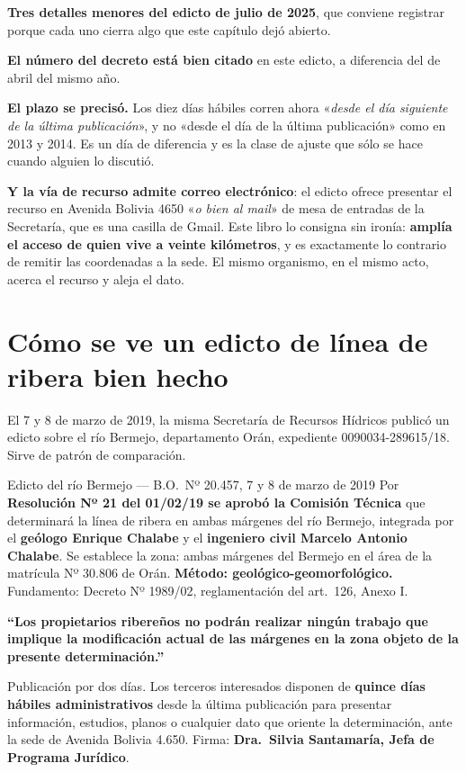 \textbf{Tres detalles menores del edicto de julio de 2025}, que conviene registrar porque cada uno cierra
algo que este capítulo dejó abierto.

\textbf{El número del decreto está bien citado} en este edicto, a diferencia del de abril del mismo año.

\textbf{El plazo se precisó.} Los diez días hábiles corren ahora «\textit{desde el día siguiente
de la última publicación}», y no «desde el día de la última publicación» como en 2013 y 2014. Es
un día de diferencia y es la clase de ajuste que sólo se hace cuando alguien lo discutió.

\textbf{Y la vía de recurso admite correo electrónico}: el edicto ofrece presentar el recurso en
Avenida Bolivia 4650 «\textit{o bien al mail}» de mesa de entradas de la Secretaría, que es una
casilla de Gmail. Este libro lo consigna sin ironía: \textbf{amplía el acceso de quien vive a
veinte kilómetros}, y es exactamente lo contrario de remitir las coordenadas a la sede. El mismo
organismo, en el mismo acto, acerca el recurso y aleja el dato.

\section{Cómo se ve un edicto de línea de ribera bien hecho}

El 7 y 8 de marzo de 2019, la misma Secretaría de Recursos Hídricos publicó un edicto sobre el río Bermejo, departamento Orán, expediente 0090034-289615/18. Sirve de patrón de comparación.

\begin{ficha}{Edicto del río Bermejo --- B.O.\ Nº 20.457, 7 y 8 de marzo de 2019}
Por \textbf{Resolución Nº 21 del 01/02/19 se aprobó la Comisión Técnica} que determinará la línea de ribera en ambas márgenes del río Bermejo, integrada por el \textbf{geólogo Enrique Chalabe} y el \textbf{ingeniero civil Marcelo Antonio Chalabe}. Se establece la zona: ambas márgenes del Bermejo en el área de la matrícula Nº 30.806 de Orán. \textbf{Método: geológico-geomorfológico.} Fundamento: Decreto Nº 1989/02, reglamentación del art.\ 126, Anexo I.

\textbf{``Los propietarios ribereños no podrán realizar ningún trabajo que implique la modificación actual de las márgenes en la zona objeto de la presente determinación.''}

Publicación por dos días. Los terceros interesados disponen de \textbf{quince días hábiles administrativos} desde la última publicación para presentar información, estudios, planos o cualquier dato que oriente la determinación, ante la sede de Avenida Bolivia 4.650. Firma: \textbf{Dra.\ Silvia Santamaría, Jefa de Programa Jurídico}.
\end{ficha}


